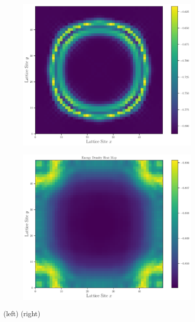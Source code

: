\documentclass[11pt, a4paper]{article}
\theoremstyle{definition} %
\begin{document}
\begin{figure}[h]
\centering
\begin{subfigure}[t]{0.49\textwidth}
	\centering
	\includegraphics[width =\textwidth]{Energydensity2d_nearest.pdf}
\end{subfigure}
\begin{subfigure}[t]{0.49\textwidth}
	\centering
	\includegraphics[width =\textwidth]{Energy_Density2D_nearest2.pdf}
\end{subfigure}
\caption{(left) (right)}
\end{figure}
\end{document}

